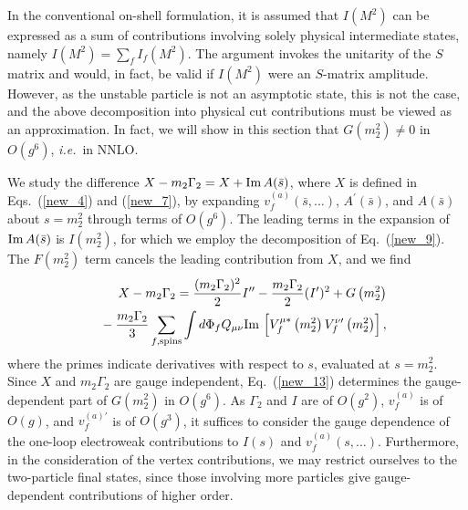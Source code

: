 \documentclass[a4paper,12pt]{article}
\begin{document}
In the conventional on-shell formulation, it is assumed that $I(M^2)$ can be
expressed as a sum of contributions involving solely physical intermediate
states, namely $I(M^2)=\sum_fI_f(M^2)$.
The argument invokes the unitarity of the $S$ matrix and would, in fact, be
valid if $I(M^2)$ were an $S$-matrix amplitude.
However, as the unstable particle is not an asymptotic state, this is not the
case, and the above decomposition into physical cut contributions must be
viewed as an approximation.
In fact, we will show in this section that $G\left(m^2_2\right)\neq0$ in
$O(g^6)$, {\it i.e.}\ in NNLO. 

We study the difference $X-m_2\Gamma_2=X+{\rm Im}\,A(\bar s)$, where $X$ is
defined in Eqs.~(\ref{new_4}) and (\ref{new_7}), by expanding
$v^{(a)}_f(\bar s,\dots)$, $A^\prime(\bar s)$, and $A(\bar s)$ about $s=m^2_2$
through terms of $O(g^6)$.
The leading terms in the expansion of ${\rm Im}\,A(\bar s)$ is
$I\left(m^2_2\right)$, for which we employ the decomposition of
Eq.~(\ref{new_9}). 
The $F\left(m^2_2\right)$ term cancels the leading contribution from $X$, and
we find 
\begin{eqnarray}
\label{new_13}
&&X-m_2\Gamma_2=\frac{(m_2\Gamma_2)^2}{2}I^{\prime\prime}
-\frac{m_2\Gamma_2}{2}(I^\prime)^2+G\left(m^2_2\right)
\nonumber\\
&&{}-\frac{m_2\Gamma_2}{3}\sum_{f,\rm spins}\int d\Phi_fQ_{\mu\nu} 
{\rm Im}\,\left[V_f^{\mu*}\left(m_2^2\right)V_f^{\nu\prime}\left(m_2^2\right)
\right],
\end{eqnarray}
where the primes indicate derivatives with respect to $s$, evaluated at
$s=m^2_2$.
Since $X$ and $m_2\Gamma_2$ are gauge independent, Eq.~(\ref{new_13})
determines the gauge-dependent part of $G\left(m^2_2\right)$ in $O(g^6)$.
As $\Gamma_2$ and $I$ are of $O(g^2)$, $v^{(a)}_f$ is of $O(g)$, and
$v^{(a)\prime}_f$ is of $O(g^3)$, it suffices to consider the gauge dependence
of the one-loop electroweak contributions to $I(s)$ and $v^{(a)}_f(s,\dots)$. 
Furthermore, in the consideration of the vertex contributions, we may restrict
ourselves to the two-particle final states, since those involving more
particles give gauge-dependent contributions of higher order. 
\end{document}
